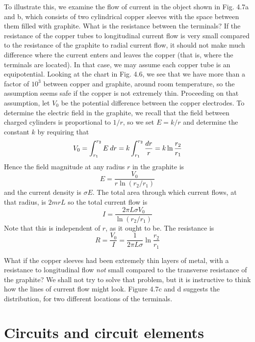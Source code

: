 To illustrate this, we examine the flow of current in the object
shown in Fig. 4.7a and b, which consists of two cylindrical copper
sleeves with the space between them filled with graphite. What is
the resistance between the terminals? If the resistance of the copper
tubes to longitudinal current flow is very small compared to the
resistance of the graphite to radial current flow, it should not make
much difference where the current enters and leaves the copper (that
is, where the terminals are located). In that case, we may assume
each copper tube is an equipotential. Looking at the chart in Fig. 4.6,
we see that we have more than a factor of $10^3$ between copper and
graphite, around room temperature, so the assumption seems safe if
the copper is not extremely thin. Proceeding on that assumption, let
$V_0$ be the potential difference between the copper electrodes. To
determine the electric field in the graphite, we recall that the field
between charged cylinders is proportional to $1/r$, so we set $E = k/r$
and determine the constant $k$ by requiring that
\begin{equation}
  V_0 = \int_{r_1}^{r_2} E\:d r = k \int_{r_1}^{r_2} \frac{d r}{r} = k \ln\frac{r_2}{r_1}
\end{equation}
Hence the field magnitude at any radius $r$ in the graphite is
\begin{equation}
  E = \frac{V_0}{r\ln(r_2/r_1)}
\end{equation}
and the current density is $\sigma E$. The total area through which current
flows, at that radius, is $2mrL$ so the total current flow is
\begin{equation}
  I = \frac{2\pi L\sigma V_0}{\ln(r_2/r_1)}
\end{equation}
Note that this is independent of $r$, as it ought to be. The resistance
is
\begin{equation}
  R = \frac{V_0}{I} = \frac{1}{2\pi L\sigma}\ln\frac{r_2}{r_1}
\end{equation}

What if the copper sleeves had been extremely thin layers of metal,
with a resistance to longitudinal flow \emph{not} small compared to the
transverse resistance of the graphite? We shall not try to solve that
problem, but it is instructive to think how the lines of current flow
might look. Figure 4.7c and d suggests the distribution, for two
different locations of the terminals.

\section{Circuits and circuit elements}

